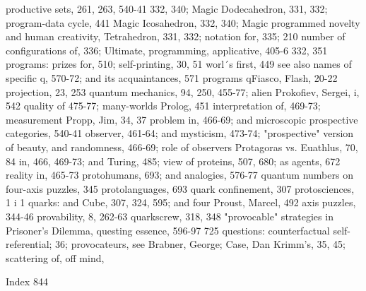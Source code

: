 productive sets, 261, 263, 540-41                   332, 340; Magic Dodecahedron, 331, 332;
program-data cycle, 441                             Magic Icosahedron, 332, 340; Magic
programmed novelty and human creativity,            Tetrahedron, 331, 332; notation for, 335;
 210                                                number of configurations of, 336; Ultimate,
programming, applicative, 405-6                     332, 351
programs: prizes for, 510; self-printing, 30, 51
 worl´s first, 449 see also names of specific      q, 570-72; and its acquaintances, 571
 programs                                          qFiasco, Flash, 20-22
projection, 23, 253                                quantum mechanics, 94, 250, 455-77; alien
Prokofiev, Sergei, i, 542                           quality of 475-77; many-worlds
Prolog, 451                                         interpretation of, 469-73; measurement
Propp, Jim, 34, 37                                  problem in, 466-69; and microscopic
prospective categories, 540-41                      observer, 461-64; and mysticism, 473-74;
"prospective" version of beauty,                    and randomness, 466-69; role of observers
Protagoras vs. Euathlus, 70, 84                     in, 466, 469-73; and Turing, 485; view of
proteins, 507, 680; as agents, 672                  reality in, 465-73
protohumans, 693; and analogies, 576-77            quantum numbers on four-axis puzzles, 345
protolanguages, 693                                quark confinement, 307
protosciences, 1 i 1                               quarks: and Cube, 307, 324, 595; and four
Proust, Marcel, 492                                 axis puzzles, 344-46
provability, 8, 262-63                             quarkscrew, 318, 348
"provocable" strategies in Prisoner's Dilemma,     questing essence, 596-97
 725                                               questions: counterfactual self-referential; 36;
provocateurs, see Brabner, George; Case,            Dan Krimm's, 35, 45; scattering of, off mind,

 Index                                                                                        844

